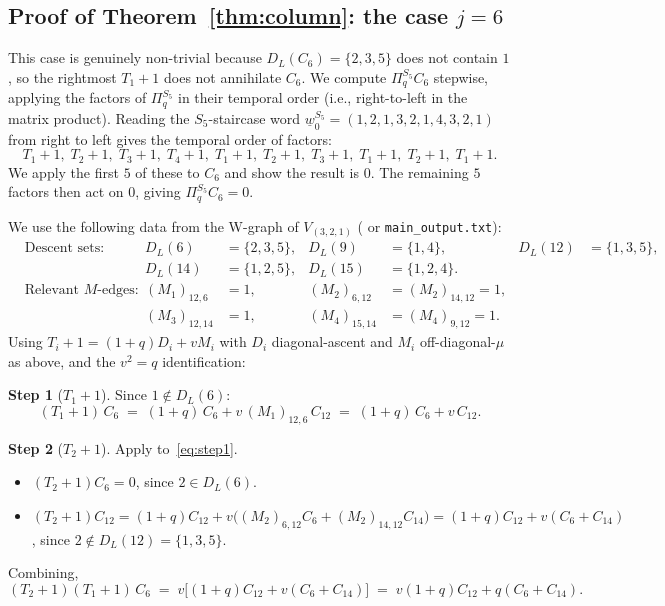 \documentclass[11pt]{article}
\theoremstyle{definition}
\begin{document}
\subsection{Proof of Theorem~\ref{thm:column}: the case $j = 6$}\label{sec:six}

This case is genuinely non-trivial because $D_L(C_6) = \{2, 3, 5\}$ does not contain $1$, so the rightmost $T_1+1$ does not annihilate $C_6$. We compute $\Pi_q^{S_5} C_6$ stepwise, applying the factors of $\Pi_q^{S_5}$ in their temporal order (i.e., right-to-left in the matrix product). Reading the $S_5$-staircase word $\underline{w}_0^{S_5} = (1, 2, 1, 3, 2, 1, 4, 3, 2, 1)$ from right to left gives the temporal order of factors:
\[
T_1+1, \; T_2+1, \; T_3+1, \; T_4+1, \; T_1+1, \; T_2+1, \; T_3+1, \; T_1+1, \; T_2+1, \; T_1+1.
\]
We apply the first $5$ of these to $C_6$ and show the result is $0$. The remaining $5$ factors then act on $0$, giving $\Pi_q^{S_5} C_6 = 0$.

We use the following data from the W-graph of $V_{(3,2,1)}$ (\cite[Section 2]{cell-ideal} or \texttt{main\_output.txt}):
\begin{align*}
&\text{Descent sets:} & D_L(6) &= \{2,3,5\}, & D_L(9) &= \{1,4\}, & D_L(12) &= \{1,3,5\},\\
&& D_L(14) &= \{1,2,5\}, & D_L(15) &= \{1,2,4\}. &&\\
&\text{Relevant $M$-edges:} & (M_1)_{12, 6} &= 1, & (M_2)_{6, 12} &= (M_2)_{14, 12} = 1,\\
&& (M_3)_{12, 14} &= 1, & (M_4)_{15, 14} &= (M_4)_{9, 12} = 1.
\end{align*}
Using $T_i + 1 = (1+q)D_i + v M_i$ with $D_i$ diagonal-ascent and $M_i$ off-diagonal-$\mu$ as above, and the $v^2 = q$ identification:

\medskip
\noindent\textbf{Step 1} ($T_1+1$). Since $1 \notin D_L(6)$:
\begin{equation}\label{eq:step1}
(T_1+1)\,C_6 \;=\; (1+q)\,C_6 + v\,(M_1)_{12, 6}\,C_{12} \;=\; (1+q)\,C_6 + v\,C_{12}.
\end{equation}

\noindent\textbf{Step 2} ($T_2+1$). Apply to~\eqref{eq:step1}.
\begin{itemize}[leftmargin=2em,topsep=0.2em,itemsep=0.1em]
\item $(T_2+1)C_6 = 0$, since $2 \in D_L(6)$.
\item $(T_2+1)C_{12} = (1+q)C_{12} + v\bigl((M_2)_{6,12}C_6 + (M_2)_{14,12}C_{14}\bigr) = (1+q)C_{12} + v(C_6 + C_{14})$, since $2 \notin D_L(12) = \{1,3,5\}$.
\end{itemize}
Combining,
\[
(T_2+1)(T_1+1)\,C_6 \;=\; v\bigl[(1+q)C_{12} + v(C_6 + C_{14})\bigr] \;=\; v(1+q)C_{12} + q(C_6 + C_{14}).
\]
\end{document}
